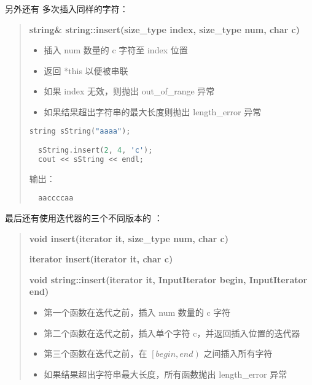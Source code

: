 \documentclass[../../LearnCpp.tex]{subfiles}
\begin{document}
另外还有  多次插入同样的字符：

\begin{quotation}
  \textbf{string\& string::insert(size\_type index, size\_type num, char c)}

  \begin{itemize}
    \item 插入 num 数量的 c 字符至 index 位置
    \item 返回 *this 以便被串联
    \item 如果 index 无效，则抛出 out\_of\_range 异常
    \item 如果结果超出字符串的最大长度则抛出 length\_error 异常
  \end{itemize}

  \begin{lstlisting}[language=C++]
  string sString("aaaa");

  sString.insert(2, 4, 'c');
  cout << sString << endl;
  \end{lstlisting}

  输出：

  \begin{lstlisting}
  aaccccaa
  \end{lstlisting}
\end{quotation}

最后还有使用迭代器的三个不同版本的 ：

\begin{quotation}
  \textbf{void insert(iterator it, size\_type num, char c)}

  \textbf{iterator insert(iterator it, char c)}

  \textbf{void string::insert(iterator it, InputIterator begin, InputIterator end)}

  \begin{itemize}
    \item 第一个函数在迭代之前，插入 num 数量的 c 字符
    \item 第二个函数在迭代之前，插入单个字符 c，并返回插入位置的迭代器
    \item 第三个函数在迭代之前，在 $\left[begin, end\right)$ 之间插入所有字符
    \item 如果结果超出字符串最大长度，所有函数抛出 length\_error 异常
  \end{itemize}
\end{quotation}
\end{document}
